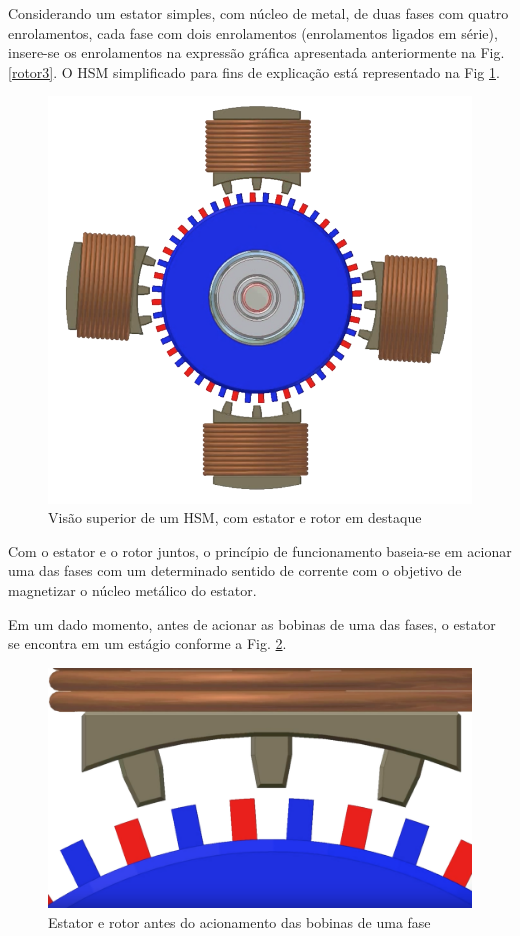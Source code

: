 	Considerando um estator simples, com núcleo de metal, de duas fases com quatro enrolamentos, cada fase com dois enrolamentos (enrolamentos ligados em série), insere-se os enrolamentos na expressão gráfica apresentada anteriormente na Fig. \ref{rotor3}. O HSM simplificado para fins de explicação está representado na Fig \ref{hsm_superior}. 
	
	 \begin{figure}[H]
		\centering 
		\includegraphics[scale=0.3]{images/hsm_operation/etapa1}
		\caption{Visão superior de um HSM, com estator e rotor em destaque}
		\label{hsm_superior}
	\end{figure}
	
	Com o estator e o rotor juntos, o princípio de funcionamento baseia-se em acionar uma das fases com um determinado sentido de corrente com o objetivo de magnetizar o núcleo metálico do estator.
	
	Em um dado momento, antes de acionar as bobinas de uma das fases, o estator se encontra em um estágio conforme a Fig. \ref{passo1}. 
	
	\begin{figure}[H]
		\centering 
		\includegraphics[scale=0.16]{images/hsm_operation/visaopasso1}
		\caption{Estator e rotor antes do acionamento das bobinas de uma fase}
		\label{passo1}
	\end{figure}
	
